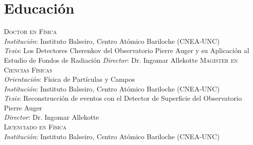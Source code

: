 \section*{Educación}
\noindent
{}\textsc{Doctor en Física}\\
{\emph{Institución}}: Instituto Balseiro, Centro Atómico Bariloche (CNEA-UNC)\\
{\emph{Tesis}}: Los Detectores Cherenkov del Observatorio Pierre Auger y su Aplicación al Estudio de Fondos de Radiación
{\emph{Director}}: Dr. Ingomar Allekotte
\textsc{Magister en Ciencias Físicas}\\
{\emph{Orientación}}: Física de Partículas y Campos\\
{\emph{Institución}}: Instituto Balseiro, Centro Atómico Bariloche (CNEA-UNC)\\
{\emph{Tesis}}: Reconstrucción de eventos con el Detector de Superficie del Observatorio Pierre Auger\\
{\emph{Director}}: Dr. Ingomar Allekotte\\ 
\textsc{Licenciado en Física}\\
{\emph{Institución}}: Instituto Balseiro, Centro Atómico Bariloche (CNEA-UNC)\\
\fi

